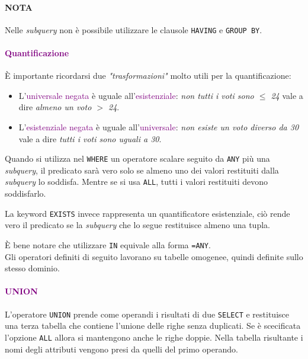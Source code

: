 \paragraph{NOTA} Nelle \emph{subquery} non è possibile utilizzare le clausole \verb|HAVING| e \verb|GROUP BY|.

\paragraph{\textcolor{purple}{Quantificazione}} È importante ricordarsi due \emph{"trasformazioni"} molto utili per la quantificazione:
\begin{itemize}
    \item L'\textcolor{purple}{universale negata} è uguale all'\textcolor{purple}{esistenziale}: \emph{non tutti i voti sono $\leq$ 24} vale a dire \emph{almeno un voto $>$ 24}.
    \item L'\textcolor{purple}{esistenziale negata} è uguale all'\textcolor{purple}{universale}: \emph{non esiste un voto diverso da 30} vale a dire \emph{tutti i voti sono uguali a 30}.
\end{itemize}

Quando si utilizza nel \verb|WHERE| un operatore scalare seguito da \verb|ANY| più una \emph{subquery}, il predicato sarà vero solo se almeno
uno dei valori restituiti dalla \emph{subquery} lo soddisfa. Mentre se si usa \verb|ALL|, tutti i valori restituiti devono soddisfarlo.

La keyword \verb|EXISTS| invece rappresenta un quantificatore esistenziale, ciò rende vero il predicato se la \emph{subquery}
che lo segue restituisce almeno una tupla.

È bene notare che utilizzare \verb|IN| equivale alla forma \verb|=ANY|. \\

Gli operatori definiti di seguito lavorano su tabelle omogenee, quindi definite sullo stesso
dominio.

\paragraph{\textcolor{purple}{UNION}} L'operatore \verb|UNION| prende come operandi i risultati di
due \verb|SELECT| e restituisce una terza tabella che contiene l'unione delle righe senza duplicati. Se è scecificata l'opzione
\verb|ALL| allora si mantengono anche le righe doppie.
Nella tabella risultante i nomi degli attributi vengono presi da quelli del primo operando.

